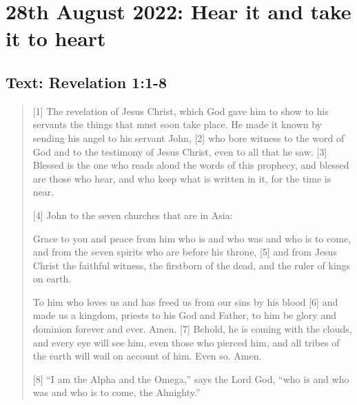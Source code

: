 \section{28th August 2022: Hear it and take it to heart}
\subsection*{Text: Revelation 1:1-8}
  \begin{quote}
    [1] The revelation of Jesus Christ, which God gave him to show to his
    servants the things that must soon take place.  He made it known by
    sending his angel to his servant John, [2] who bore witness to the word
    of God and to the testimony of Jesus Christ, even to all that he saw.
    [3] Blessed is the one who reads aloud the words of this prophecy, and
    blessed are those who hear, and who keep what is written in it, for the
    time is near.

    [4] John to the seven churches that are in Asia:

    Grace to you and peace from him who is and who was and who is to come,
    and from the seven spirits who are before his throne, [5] and from Jesus
    Christ the faithful witness, the firstborn of the dead, and the ruler of
    kings on earth.

    To him who loves us and has freed us from our sins by his blood [6] and
    made us a kingdom, priests to his God and Father, to him be glory and
    dominion forever and ever.  Amen.  [7] Behold, he is coming with the
    clouds, and every eye will see him, even those who pierced him, and all
    tribes of the earth will wail on account of him.  Even so.  Amen.

    [8] “I am the Alpha and the Omega,” says the Lord God, “who is and who
    was and who is to come, the Almighty.”
  \end{quote}
